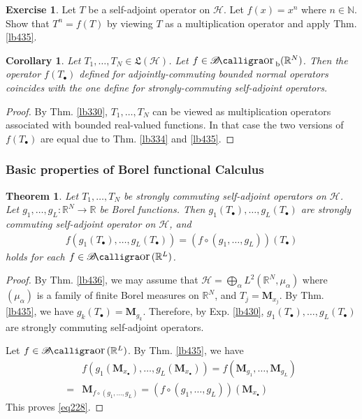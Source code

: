 \documentclass[12pt,b5paper,notitlepage]{article}
\theoremstyle{definition}
\newtheorem{exe}[df]{Exercise}
\theoremstyle{plain}
\newtheorem{thm}[df]{Theorem}
\newtheorem{co}[df]{Corollary}
\DeclareMathOperator{\Bor}{\mathscr{B}\text{\kern -2pt {\calligra\large or}}\,}
\DeclareMathOperator{\Borb}{{\mathscr{B}\text{\kern -2pt {\calligra\large or}}\,}_{\mathrm b}}
\newcommand{\fk}{\mathfrak}
\newcommand{\blt}{\bullet}
\newcommand{\Nbb}{\mathbb N}
\newcommand{\Rbb}{\mathbb R}
\newcommand{\MH}{\mathcal H}
\newcommand{\Mbf}{\mathbf M}
\numberwithin{equation}{section}
\begin{document}
\begin{exe}\label{lb445}
Let $T$ be a self-adjoint operator on $\MH$. Let $f(x)=x^n$ where $n\in\Nbb$. Show that $T^n=f(T)$ by viewing $T$ as a multiplication operator and apply Thm. \ref{lb435}.
\end{exe}



\begin{co}\label{lb506}
Let $T_1,\dots,T_N\in\fk L(\MH)$. Let $f\in\Borb(\Rbb^N)$. Then the operator $f(T_\blt)$ defined for adjointly-commuting bounded normal operators coincides with the one define for strongly-commuting self-adjoint operators.
\end{co}

\begin{proof}
By Thm. \ref{lb330}, $T_1,\dots,T_N$ can be viewed as multiplication operators associated with bounded real-valued functions. In that case the two versions of $f(T_\blt)$ are equal due to Thm. \ref{lb334} and \ref{lb435}.
\end{proof}






\subsubsection{Basic properties of Borel functional Calculus}



\begin{thm}\label{lb437}
Let $T_1,\dots,T_N$ be strongly commuting self-adjoint operators on $\MH$. Let $g_1,\dots,g_L:\Rbb^N\rightarrow\Rbb$ be Borel functions. Then $g_1(T_\blt),\dots,g_L(T_\blt)$ are strongly commuting self-adjoint operator on $\MH$, and
\begin{align}\label{eq228}
f(g_1(T_\blt),\dots,g_L(T_\blt))=(f\circ(g_1,\dots,g_L))(T_\blt)
\end{align}
holds for each $f\in\Bor(\Rbb^L)$.
\end{thm}


\begin{proof}
By Thm. \ref{lb436}, we may assume that $\MH=\bigoplus_\alpha L^2(\Rbb^N,\mu_\alpha)$ where $(\mu_\alpha)$ is a family of finite Borel measures on $\Rbb^N$, and $T_j=\Mbf_{x_j}$. By Thm. \ref{lb435}, we have $g_k(T_\blt)=\Mbf_{g_k}$. Therefore, by Exp. \ref{lb430}, $g_1(T_\blt),\dots,g_L(T_\blt)$ are strongly commuting self-adjoint operators.

Let $f\in\Bor(\Rbb^L)$. By Thm. \ref{lb435}, we have
\begin{align*}
&f(g_1(\Mbf_{x_\blt}),\dots,g_L(\Mbf_{x_\blt}))=f(\Mbf_{g_1},\dots,\Mbf_{g_L})\\
=&\Mbf_{f\circ(g_1,\dots,g_L)}=(f\circ(g_1,\dots,g_L))(\Mbf_{x_\blt})
\end{align*}
This proves \eqref{eq228}.
\end{proof}
\end{document}
